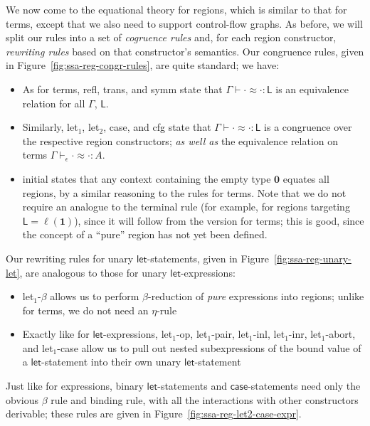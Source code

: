 \documentclass[acmsmall,screen,review]{acmart}
\newcommand{\mb}[1]{\ensuremath{\mathbf{#1}}}
\newcommand{\ms}[1]{\ensuremath{\mathsf{#1}}}
\newcommand{\lhyp}[2]{#1(#2)}
\newcommand{\teqv}{\approx}
\newcommand{\tmeq}[5]{#1 \vdash_{#2} #3 \teqv #4 : {#5}}
\newcommand{\lbeq}[4]{#1 \vdash #2 \teqv #3 : {#4}}
\newcommand{\brle}[1]{{\scriptsize\textsf{#1}}}
\begin{document}
We now come to the equational theory for regions, which is similar to that for terms, except that we
also need to support control-flow graphs. As before, we will split our rules into a set of
\emph{cogruence rules} and, for each region constructor, \emph{rewriting rules} based on that
constructor's semantics. Our congruence rules, given in Figure~\ref{fig:ssa-reg-congr-rules}, are
quite standard; we have:
\begin{itemize}
  \item As for terms, \brle{refl}, \brle{trans}, and \brle{symm} state that
  $\lbeq{\Gamma}{\cdot}{\cdot}{\ms{L}}$ is an equivalence relation for all $\Gamma$, $\ms{L}$.
  \item Similarly, \brle{let$_1$}, \brle{let$_2$}, \brle{case}, and \brle{cfg} state that
  $\lbeq{\Gamma}{\cdot}{\cdot}{\ms{L}}$ is a congruence over the respective region constructors;
  \emph{as well as} the equivalence relation on terms $\tmeq{\Gamma}{\epsilon}{\cdot}{\cdot}{A}$.
  \item \brle{initial} states that any context containing the empty type $\mb{0}$ equates all
  regions, by a similar reasoning to the rules for terms. Note that we do not require an analogue to
  the \brle{terminal} rule (for example, for regions targeting $\ms{L} = \lhyp{\ell}{\mb{1}}$),
  since it will follow from the version for terms; this is good, since the concept of a ``pure''
  region has not yet been defined.
\end{itemize}
Our rewriting rules for unary \ms{let}-statements, given in Figure~\ref{fig:ssa-reg-unary-let}, are
analogous to those for unary \ms{let}-expressions:
\begin{itemize}
  \item \brle{let$_1$-$\beta$} allows us to perform $\beta$-reduction of \emph{pure} expressions
  into regions; unlike for terms, we do not need an $\eta$-rule
  \item Exactly like for \ms{let}-expressions, \brle{let$_1$-op}, \brle{let$_1$-pair},
  \brle{let$_1$-inl}, \brle{let$_1$-inr}, \brle{let$_1$-abort}, and \brle{let$_1$-case} allow us
  to pull out nested subexpressions of the bound value of a \ms{let}-statement into their own
  unary \ms{let}-statement
\end{itemize}
Just like for expressions, binary \ms{let}-statements and \ms{case}-statements need only the obvious
$\beta$ rule and binding rule, with all the interactions with other constructors derivable; these
rules are given in Figure~\ref{fig:ssa-reg-let2-case-expr}.
\end{document}
